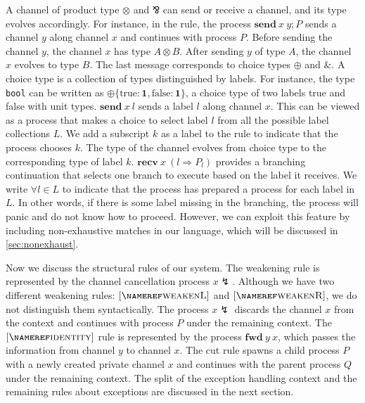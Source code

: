 \documentclass[12pt, openany]{memoir}
\newcommand*{\pare}[0]{\mathbin{\bindnasrepma}}
\newcommand*{\send}[2]{\textbf{send}\ #1\ #2}
\newcommand*{\recv}[2]{\textbf{recv}\ #1\ #2}
\newcommand*{\fwd}[2]{\textbf{fwd}\ #1\ #2}
\newcommand*{\cancel}[1]{#1 \lightning}
\begin{document}
A channel of product type $\otimes$ and $\pare$ can send or receive a channel, and its type evolves accordingly. 
For instance, in the  rule, the process $\send{x}{y}; P$ sends a channel $y$ along channel $x$ and continues with process $P$. 
Before sending the channel $y$, the channel $x$ has type $A \otimes B$. 
After sending $y$ of type $A$, the channel $x$ evolves to type $B$. The last message corresponds to choice types $\oplus$ and $\&$. 
A choice type is a collection of types distinguished by labels. 
For instance, the type \texttt{bool} can be written as $\oplus\{\text{true} : \textbf{1}, \text{false} : \textbf{1}\}$, 
a choice type of two labels true and false with unit types. $\send{x}{l}$ sends a label $l$ along channel $x$. 
This can be viewed as a process that makes a choice to select label $l$ from all the possible label collections $L$. 
We add a subscript $k$ as a label to the  rule to indicate that the process chooses $k$. 
The type of the channel evolves from choice type to the corresponding type of label $k$. 
$\recv{x}{(l \Rightarrow P_l)}$ provides a branching continuation that selects one branch to execute based on the label it receives. 
We write $\forall l \in L$ to indicate that the process has prepared a process for each label in $L$. 
In other words, if there is some label missing in the branching, the process will panic and do not know how to proceed. 
However, we can exploit this feature by including non-exhaustive matches in our language, which will be discussed in \cref{sec:nonexhaust}.

Now we discuss the structural rules of our system. The weakening rule is represented by the channel cancellation process $\cancel{x}$. 
Although we have two different weakening rules: $\ruleref{weakenL}$ and $\ruleref{weakenR}$, we do not distinguish them syntactically. 
The process $\cancel{x}$ discards the channel $x$ from the context and continues with process $P$ under the remaining context. 
The $\ruleref{identity}$ rule is represented by the process $\fwd{y}{x}$, which passes the information from channel $y$ to channel $x$. 
The cut rule spawns a child process $P$ with a newly created private channel $x$ and continues with the parent process $Q$ under the remaining context. 
The split of the exception handling context and the remaining rules about exceptions are discussed in the next section.
\end{document}
